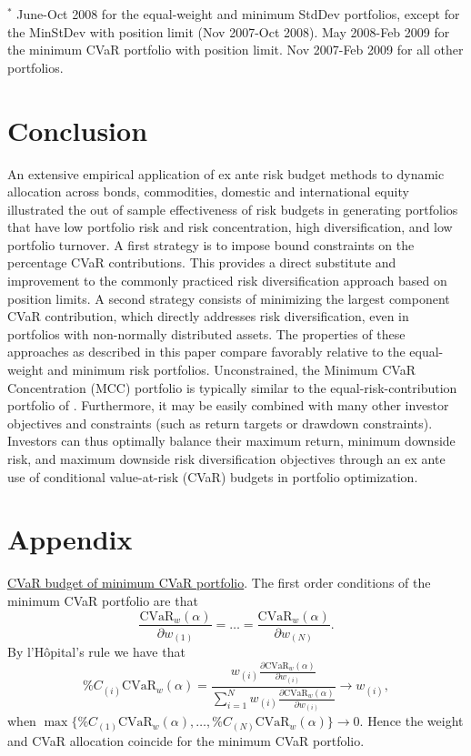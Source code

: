 \documentclass[12pt,a4paper]{article}
\begin{document}
\begin{landscape}
\begin{table}[tb]
{\scriptsize $^{*}$ June-Oct 2008 for the equal-weight and minimum StdDev portfolios, except for the MinStDev with position limit (Nov 2007-Oct 2008). May 2008-Feb 2009 for the minimum CVaR portfolio with position limit. Nov 2007-Feb 2009 for all other portfolios. }
\end{table}
\end{landscape}

\section{Conclusion \label{sec:Conclusion}}

An extensive empirical application of ex ante risk budget methods to dynamic allocation across bonds, commodities, domestic and international equity illustrated the out of sample effectiveness of risk budgets in generating portfolios that have low portfolio risk and risk concentration, high diversification, and low portfolio turnover. A first strategy is to impose bound constraints on the percentage CVaR contributions. This provides a direct substitute and improvement to the commonly practiced risk diversification approach based on position limits. A second strategy consists of minimizing the largest component CVaR contribution, which directly addresses risk diversification, even in portfolios with non-normally distributed assets. The properties of these approaches as described in this paper compare favorably relative to the equal-weight and minimum risk portfolios. Unconstrained, the Minimum CVaR Concentration (MCC) portfolio is typically similar to the equal-risk-contribution portfolio of \citet{Qian2005}. Furthermore, it may be easily combined with many other investor objectives and constraints (such as return targets or drawdown constraints). Investors can thus optimally balance their maximum return, minimum downside risk, and maximum downside risk diversification objectives through an ex ante use of conditional value-at-risk (CVaR) budgets in portfolio optimization. 

\bigskip

\section{Appendix \label{sec:Appendix}}

\noindent \underline{CVaR budget of minimum CVaR portfolio}.
The first order conditions of the minimum CVaR portfolio are that
\begin{equation} \frac{ \mbox{CVaR}_w(\alpha)}{\partial w_{(1)}} = \ldots = \frac{ \mbox{CVaR}_w(\alpha)}{\partial w_{(N)}} .\end{equation}
By l'H\^{o}pital's rule we have that
\begin{equation} \%C_{(i)} \mbox{CVaR}_w(\alpha) = \frac{w_{(i)} \frac{\partial\mbox{CVaR}_w(\alpha) }{\partial w_{(i)}}}{\sum_{i=1}^N w_{(i)}\frac{\partial\mbox{CVaR}_w(\alpha) }{\partial w_{(i)}}}
\to w_{(i)},\end{equation} when $\max\{ \%C_{(1)}\mbox{CVaR}_w(\alpha) , \ldots ,  \%C_{(N)}\mbox{CVaR}_w(\alpha) \} \to 0.$ Hence the weight and CVaR allocation coincide for the minimum CVaR portfolio.
\end{document}
